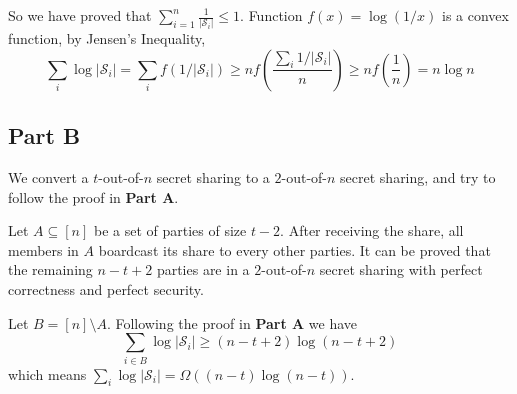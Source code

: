 \documentclass[8pt]{article}
\theoremstyle{compact}
\def\le{\leqslant}
\def\ge{\geqslant}
\begin{document}
So we have proved that $\sum_{i=1}^{n}\frac{1}{|\mathcal S_i|} \le 1$. Function $f(x) = \log (1/x)$ is a convex function, by Jensen's Inequality, $$\sum_i\log|\mathcal S_i| = \sum_i f(1/|\mathcal S_i|) \ge nf\left(\frac{\sum_i 1/|\mathcal S_i|}{n}\right) \ge nf\left(\frac 1n\right) = n\log n$$

\subsection*{Part B}

We convert a $t$-out-of-$n$ secret sharing to a $2$-out-of-$n$ secret sharing, and try to follow the proof in \textbf{Part A}.

Let $A \subseteq [n]$ be a set of parties of size $t - 2$. After receiving the share, all members in $A$ boardcast its share to every other parties. It can be proved that the remaining $n - t + 2$ parties are in a $2$-out-of-$n$ secret sharing with perfect correctness and perfect security.

Let $B = [n] \setminus A$. Following the proof in \textbf{Part A} we have $$\sum_{i \in B}\log |\mathcal S_i| \ge (n-t+2)\log(n-t+2)$$ 
which means $\sum_i\log|\mathcal S_i| = \Omega((n-t)\log(n-t))$.
\end{document}
